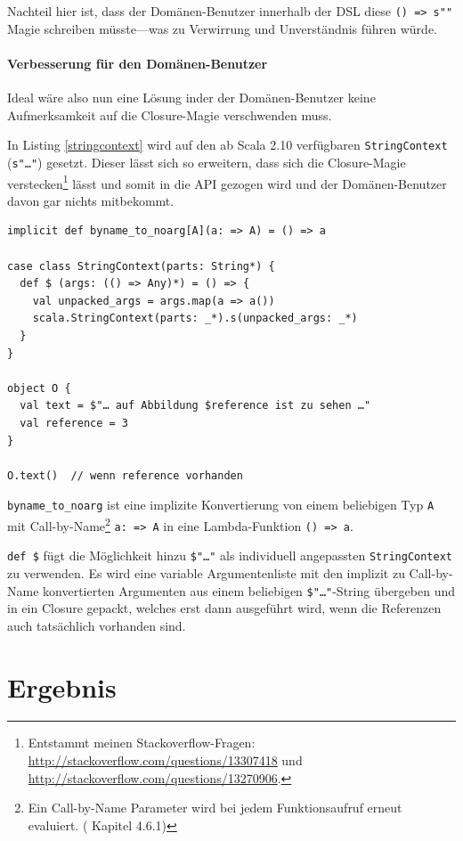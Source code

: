 Nachteil hier ist, dass der Domänen-Benutzer innerhalb der DSL diese
\verb|() => s""| Magie schreiben müsste---was zu Verwirrung und
Unverständnis führen würde.


\paragraph{Verbesserung für den Domänen-Benutzer}

Ideal wäre also nun eine Lösung inder der Domänen-Benutzer keine
Aufmerksamkeit auf die Closure-Magie verschwenden muss.

In Listing \ref{stringcontext} wird auf den ab Scala 2.10 verfügbaren
\verb|StringContext| (\verb|s"…"|)
gesetzt. \cite{scala-stringInterpolation}
Dieser lässt sich so erweitern, dass
sich die Closure-Magie verstecken\footnote{Entstammt meinen
Stackoverflow-Fragen: \url{http://stackoverflow.com/questions/13307418} und
\url{http://stackoverflow.com/questions/13270906}.} lässt und somit in die API
gezogen wird und der Domänen-Benutzer davon gar nichts mitbekommt.

\begin{lstlisting}[label=stringcontext,caption=Erweiterter StringContext]
implicit def byname_to_noarg[A](a: => A) = () => a

case class StringContext(parts: String*) {
  def $ (args: (() => Any)*) = () => {
    val unpacked_args = args.map(a => a())
    scala.StringContext(parts: _*).s(unpacked_args: _*)
  }
}

object O {
  val text = $"… auf Abbildung $reference ist zu sehen …"
  val reference = 3
}

O.text()  // wenn reference vorhanden
\end{lstlisting}

\verb|byname_to_noarg| ist eine implizite Konvertierung von einem
beliebigen Typ \verb|A| mit Call-by-Name\footnote{Ein Call-by-Name
Parameter wird bei jedem Funktionsaufruf erneut evaluiert.
(\cite{scala-ref} Kapitel 4.6.1)}
\verb|a: => A| in eine Lambda-Funktion \verb|() => a|.

\verb|def $| fügt die Möglichkeit hinzu \verb|$"…"| als individuell
angepassten \verb|StringContext| zu verwenden. Es wird eine variable 
Argumentenliste mit den implizit zu Call-by-Name konvertierten Argumenten
aus einem beliebigen \verb|$"…"|-String übergeben und in ein Closure gepackt,
welches erst dann ausgeführt wird, wenn die Referenzen auch tatsächlich
vorhanden sind.


\section{Ergebnis}

